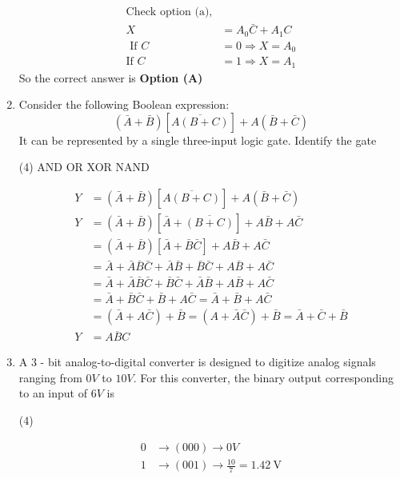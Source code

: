 \begin{enumerate}
\begin{answer}
\begin{align*}
\text{Check option (a),}\\
X&=A_{0} \bar{C}+A_{1} C\\
\text{	If }C&=0 \Rightarrow X=A_{0}\\
\text{If }C&=1 \Rightarrow X=A_{1}
\end{align*}
So the correct answer is \textbf{Option (A)}
\end{answer}
	\item Consider the following Boolean expression:
	$$
	(\bar{A}+\bar{B})[\overline{A(B+C)}]+A(\bar{B}+\bar{C})
	$$
	It can be represented by a single three-input logic gate. Identify the gate
	{}
\begin{tasks}(4)
\task[\textbf{A.}]  AND
\task[\textbf{B.}] OR
\task[\textbf{C.}] XOR
\task[\textbf{D.}] NAND
\end{tasks}
\begin{answer}
\begin{align*}
Y&=(\bar{A}+\bar{B})[\overline{A(B+C)}]+A(\bar{B}+\bar{C})\\
Y&=(\bar{A}+\bar{B})[\bar{A}+\overline{(B+C)}]+A \bar{B}+A \bar{C}\\
&=(\bar{A}+\bar{B})[\bar{A}+\bar{B} \bar{C}]+A \bar{B}+A \bar{C}\\
&=\bar{A}+\bar{A} \bar{B} \bar{C}+\bar{A} \bar{B}+\bar{B} \bar{C}+A \bar{B}+A \bar{C}\\
&=\bar{A}+\bar{A} \bar{B} \bar{C}+\bar{B} \bar{C}+\bar{A} \bar{B}+A \bar{B}+A \bar{C}\\
&=\bar{A}+\bar{B} \bar{C}+\bar{B}+A \bar{C}=\bar{A}+\bar{B}+A \bar{C}\\
&=(\bar{A}+A \bar{C})+\bar{B}=(A+\bar{A} \bar{C})+\bar{B}=\bar{A}+\bar{C}+\bar{B}\\
Y&=\overline{A B C}
\end{align*}
\end{answer}
	\item A 3 - bit analog-to-digital converter is designed to digitize analog signals ranging from $0 V$ to $10 V$. For this converter, the binary output corresponding to an input of $6 V$ is
{	}
\begin{tasks}(4)
\end{tasks}
\begin{answer}
\begin{align*}
0& \rightarrow(000) \rightarrow 0 V\\
1& \rightarrow(001) \rightarrow \frac{10}{7}=1.42 \mathrm{~V}\\

\end{align*}
\end{answer}
\end{enumerate}
